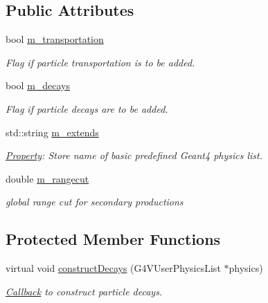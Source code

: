 \subsection*{Public Attributes}
\begin{DoxyCompactItemize}
\item 
bool \hyperlink{class_d_d4hep_1_1_simulation_1_1_geant4_physics_list_action_sequence_aa8940ea98233de519fa743f4cbf02381}{m\_\-transportation}
\begin{DoxyCompactList}\small\item\em Flag if particle transportation is to be added. \item\end{DoxyCompactList}\item 
bool \hyperlink{class_d_d4hep_1_1_simulation_1_1_geant4_physics_list_action_sequence_a92b7972cbc8ee15f7213d68609121b4e}{m\_\-decays}
\begin{DoxyCompactList}\small\item\em Flag if particle decays are to be added. \item\end{DoxyCompactList}\item 
std::string \hyperlink{class_d_d4hep_1_1_simulation_1_1_geant4_physics_list_action_sequence_a0231a66223374c98dd4d0763893e8cad}{m\_\-extends}
\begin{DoxyCompactList}\small\item\em \hyperlink{class_d_d4hep_1_1_property}{Property}: Store name of basic predefined Geant4 physics list. \item\end{DoxyCompactList}\item 
double \hyperlink{class_d_d4hep_1_1_simulation_1_1_geant4_physics_list_action_sequence_a125a5acaa8915ef45d5832351ce3a9df}{m\_\-rangecut}
\begin{DoxyCompactList}\small\item\em global range cut for secondary productions \item\end{DoxyCompactList}\end{DoxyCompactItemize}
\subsection*{Protected Member Functions}
\begin{DoxyCompactItemize}
\item 
virtual void \hyperlink{class_d_d4hep_1_1_simulation_1_1_geant4_physics_list_action_sequence_ad87f044fc81f3ac371ad5396dcb21d53}{constructDecays} (G4VUserPhysicsList $\ast$physics)
\begin{DoxyCompactList}\small\item\em \hyperlink{class_d_d4hep_1_1_callback}{Callback} to construct particle decays. \item\end{DoxyCompactList}\end{DoxyCompactItemize}
